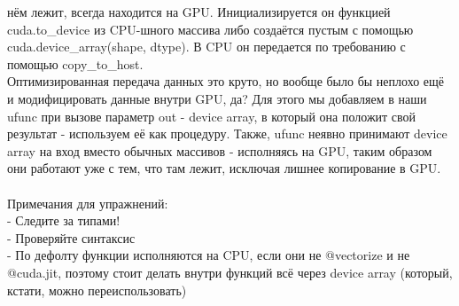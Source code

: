 \documentclass[14pt]{extarticle}
\begin{document}
нём лежит, всегда находится на GPU. Инициализируется он функцией 
cuda.to\_device из CPU-шного массива либо создаётся пустым 
с помощью cuda.device\_array(shape, dtype). В CPU он передается 
по требованию с помощью copy\_to\_host.\\
Оптимизированная передача данных это круто, но вообще было бы неплохо
ещё и модифицировать данные внутри GPU, да? Для этого мы добавляем
в наши ufunc при вызове параметр out - device array, 
в который она положит свой результат -
используем её как процедуру. Также, ufunc неявно принимают
device array на вход вместо обычных массивов - исполняясь
на GPU, таким образом они работают уже с тем, что там лежит,
исключая лишнее копирование в GPU.\\
\\
Примечания для упражнений:\\
- Следите за типами!\\
- Проверяйте синтаксис\\
- По дефолту функции исполняются на CPU, если они не 
@vectorize и не @cuda.jit, поэтому стоит делать внутри 
функций всё через device array (который, кстати, можно 
переиспользовать)
\end{document}
